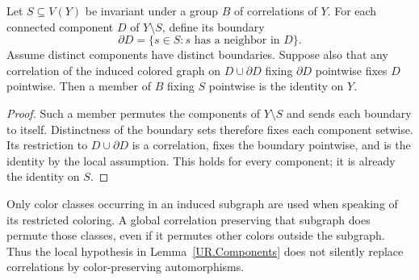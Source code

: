 \begin{lemma}\label{UR.Components}
Let $S\subseteq V(Y)$ be invariant under a group $B$ of correlations of $Y$.
For each connected component $D$ of $Y\setminus S$, define its boundary
\[
 \partial D=\{s\in S:\text{$s$ has a neighbor in $D$}\}.
\]
Assume distinct components have distinct boundaries. Suppose also that any
correlation of the induced colored graph on $D\cup\partial D$ fixing
$\partial D$ pointwise fixes $D$ pointwise. Then a member of $B$ fixing $S$
pointwise is the identity on $Y$.
\end{lemma}
\begin{proof}
Such a member permutes the components of $Y\setminus S$ and sends each
boundary to itself. Distinctness of the boundary sets therefore fixes each
component setwise. Its restriction to $D\cup\partial D$ is a correlation,
fixes the boundary pointwise, and is the identity by the local assumption.
This holds for every component; it is already the identity on $S$.
\end{proof}

Only color classes occurring in an induced subgraph are used when speaking of
its restricted coloring. A global correlation preserving that subgraph does
permute those classes, even if it permutes other colors outside the subgraph.
Thus the local hypothesis in Lemma~\ref{UR.Components} does not silently
replace correlations by color-preserving automorphisms.
